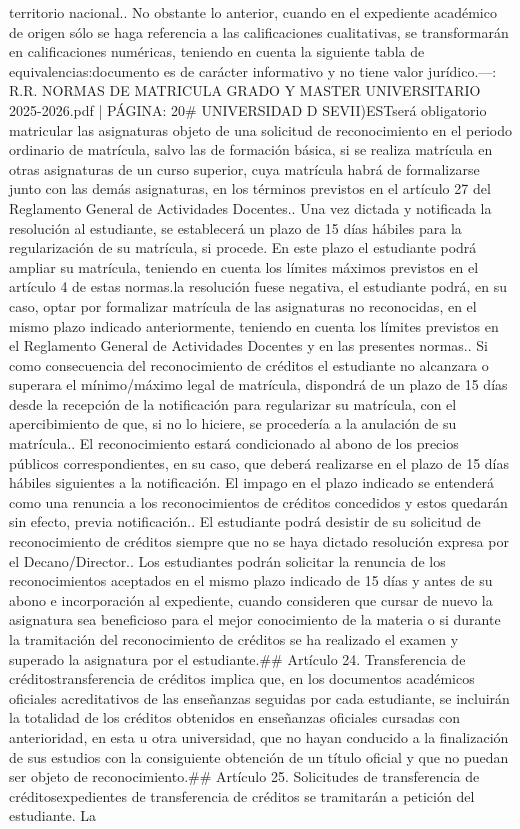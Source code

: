 \documentclass{article}
\begin{document}
\begin{itemize}
{{territorio nacional.\n{}. No obstante lo anterior, cuando en el expediente académico de origen sólo se haga referencia a las calificaciones cualitativas, se transformarán en calificaciones numéricas, teniendo en cuenta la siguiente tabla de equivalencias:\n\nEste documento es de carácter informativo y no tiene valor jurídico.\n\n---\n\nFUENTE: R.R. NORMAS DE MATRICULA GRADO Y MASTER UNIVERSITARIO 2025-2026.pdf | PÁGINA: 20\n# UNIVERSIDAD D SEVII\n\nC)EST\n\nNo será obligatorio matricular las asignaturas objeto de una solicitud de reconocimiento en el periodo ordinario de matrícula, salvo las de formación básica, si se realiza matrícula en otras asignaturas de un curso superior, cuya matrícula habrá de formalizarse junto con las demás asignaturas, en los términos previstos en el artículo 27 del Reglamento General de Actividades Docentes.\n{}. Una vez dictada y notificada la resolución al estudiante, se establecerá un plazo de 15 días hábiles para la regularización de su matrícula, si procede. En este plazo el estudiante podrá ampliar su matrícula, teniendo en cuenta los límites máximos previstos en el artículo 4 de estas normas.\n\nSi la resolución fuese negativa, el estudiante podrá, en su caso, optar por formalizar matrícula de las asignaturas no reconocidas, en el mismo plazo indicado anteriormente, teniendo en cuenta los límites previstos en el Reglamento General de Actividades Docentes y en las presentes normas.\n{}. Si como consecuencia del reconocimiento de créditos el estudiante no alcanzara o superara el mínimo/máximo legal de matrícula, dispondrá de un plazo de 15 días desde la recepción de la notificación para regularizar su matrícula, con el apercibimiento de que, si no lo hiciere, se procedería a la anulación de su matrícula.\n{}. El reconocimiento estará condicionado al abono de los precios públicos correspondientes, en su caso, que deberá realizarse en el plazo de 15 días hábiles siguientes a la notificación. El impago en el plazo indicado se entenderá como una renuncia a los reconocimientos de créditos concedidos y estos quedarán sin efecto, previa notificación.\n{}. El estudiante podrá desistir de su solicitud de reconocimiento de créditos siempre que no se haya dictado resolución expresa por el Decano/Director.\n{}. Los estudiantes podrán solicitar la renuncia de los reconocimientos aceptados en el mismo plazo indicado de 15 días y antes de su abono e incorporación al expediente, cuando consideren que cursar de nuevo la asignatura sea beneficioso para el mejor conocimiento de la materia o si durante la tramitación del reconocimiento de créditos se ha realizado el examen y superado la asignatura por el estudiante.\n\n## Artículo 24. Transferencia de créditos\n\nLa transferencia de créditos implica que, en los documentos académicos oficiales acreditativos de las enseñanzas seguidas por cada estudiante, se incluirán la totalidad de los créditos obtenidos en enseñanzas oficiales cursadas con anterioridad, en esta u otra universidad, que no hayan conducido a la finalización de sus estudios con la consiguiente obtención de un título oficial y que no puedan ser objeto de reconocimiento.\n\n## Artículo 25. Solicitudes de transferencia de créditos\n\nLos expedientes de transferencia de créditos se tramitarán a petición del estudiante. La }}
\end{itemize}
\end{document}
